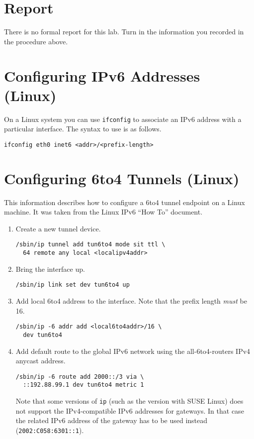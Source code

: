 \documentclass[twocolumn]{article}
\begin{document}
\section{Report}

There is no formal report for this lab. Turn in the information you recorded in the procedure
above.

\appendix

\section{Configuring IPv6 Addresses (Linux)}

On a Linux system you can use \texttt{ifconfig} to associate an IPv6 address with a particular
interface. The syntax to use is as follows.
\begin{verbatim}
ifconfig eth0 inet6 <addr>/<prefix-length>
\end{verbatim}

\section{Configuring 6to4 Tunnels (Linux)}

This information describes how to configure a 6to4 tunnel endpoint on a Linux machine. It was
taken from the Linux IPv6 ``How To'' document.

\begin{enumerate}
\item Create a new tunnel device.
\begin{verbatim}
/sbin/ip tunnel add tun6to4 mode sit ttl \
  64 remote any local <localipv4addr>
\end{verbatim}

\item Bring the interface up.
\begin{verbatim}
/sbin/ip link set dev tun6to4 up
\end{verbatim}

\item Add local 6to4 address to the interface. Note that the prefix length \emph{must} be 16.
\begin{verbatim}
/sbin/ip -6 addr add <local6to4addr>/16 \
  dev tun6to4
\end{verbatim}

\item Add default route to the global IPv6 network using the all-6to4-routers IPv4 anycast
  address.
\begin{verbatim}
/sbin/ip -6 route add 2000::/3 via \
  ::192.88.99.1 dev tun6to4 metric 1
\end{verbatim}

  Note that some versions of \texttt{ip} (such as the version with SUSE Linux) does not support
  the IPv4-compatible IPv6 addresses for gateways. In that case the related IPv6 address of the
  gateway has to be used instead (\texttt{2002:C058:6301::1}).
\end{enumerate}
\end{document}
